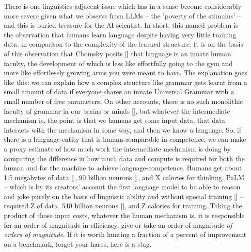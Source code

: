 There is one linguistics-adjacent issue which has in a sense become considerably more severe given what we observe from LLMs -- the 'poverty of the stimulus' -- and this is buried treasure for the AI-scientist. In short, this named problem is the observation that humans learn language despite having very little training data, in comparison to the complexity of the learned structure. It is on the basis of this observation that Chomsky posits [] that language is an innate human faculty, the development of which is less like effortfully going to the gym and more like effortlessly growing arms you were meant to have. The explanation goes like this: we can explain how a complex structure like grammar gets learnt from a small amount of data if everyone shares an innate Universal Grammar with a small number of free parameters. On other accounts, there is no such monolithic faculty of grammar in our brains or minds [], but whatever the intermediate mechanism is, the point is that we humans get some input data, that data interacts with the mechanism in some way, and then we know a language. So, if there is a language-entity that is human-comparable in competence, we can make a proxy estimate of how much work the intermediate mechanism is doing by comparing the difference in how much data and compute is required for both the human and for the machine to achieve language-competence. Humans get about 1.5 megabytes of data [], 90 billion neurons [], and X calories for thinking. PaLM -- which is by its creators' account the first language model to be able to reason and joke purely on the basis of linguistic ability and without special training [] -- required Z of data, 540 billion neurons [], and Z calories for training. Taking the product of those input costs, whatever the human mechanism is, it is responsible for an order of magnitude in efficiency, give or take an order of magnitude \emph{of orders of magnitude}. If it is worth hunting a fraction of a percent of improvement on a benchmark, forget your hares, here is a stag.\\


